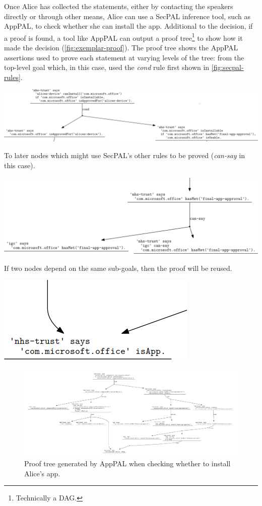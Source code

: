 \documentclass[thesis.tex]{subfiles}
\begin{document}
Once Alice has collected the statements, either by contacting the speakers
directly or through other means, Alice can use a SecPAL inference tool, such as
AppPAL, to check whether she can install the app. Additional to the decision, if
a proof is found, a tool like AppPAL can output a proof
tree\footnote{Technically a DAG.} to show how it made the decision
(\autoref{fig:exemplar-proof}). The proof tree shows the AppPAL assertions used
to prove each statement at varying levels of the tree: from the top-level
goal which, in this case, used the \emph{cond} rule first shown in \autoref{fig:secpal-rules}.

\begin{center}
  \includegraphics[width=0.9\linewidth]{figures/exemplar-proof-1.png}
\end{center}

To later nodes which might use SecPAL's other rules to be proved (\emph{can-say} in this case).

\begin{center}
  \includegraphics[width=0.9\linewidth]{figures/exemplar-proof-2.png}
\end{center}

If two nodes depend on the same sub-goals, then the proof will be reused.

\begin{center}
  \includegraphics[width=0.3\linewidth]{figures/exemplar-proof-3.png}
\end{center}

\begin{figure}
  \centering
  \includegraphics[width=0.9\textheight, angle=90]{figures/exemplar-proof.pdf}
  \caption[Proof tree output by AppPAL.]{Proof tree generated by AppPAL when checking whether to install Alice's app.}
  \label{fig:exemplar-proof}
\end{figure}
\end{document}
